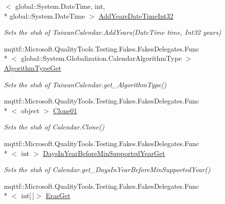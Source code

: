 \begin{DoxyCompactItemize}
$<$ global\-::\-System.\-Date\-Time, int, \\*
global\-::\-System.\-Date\-Time $>$ \hyperlink{class_system_1_1_globalization_1_1_fakes_1_1_stub_taiwan_calendar_a4f6e2936117ba147c50b7cf13d58997e}{Add\-Years\-Date\-Time\-Int32}
\begin{DoxyCompactList}\small\item\em Sets the stub of Taiwan\-Calendar.\-Add\-Years(\-Date\-Time time, Int32 years)\end{DoxyCompactList}\item 
mqttf\-::\-Microsoft.\-Quality\-Tools.\-Testing.\-Fakes.\-Fakes\-Delegates.\-Func\\*
$<$ global\-::\-System.\-Globalization.\-Calendar\-Algorithm\-Type $>$ \hyperlink{class_system_1_1_globalization_1_1_fakes_1_1_stub_taiwan_calendar_a5fa0c54b67c735e7a128d7a6c2f53996}{Algorithm\-Type\-Get}
\begin{DoxyCompactList}\small\item\em Sets the stub of Taiwan\-Calendar.\-get\-\_\-\-Algorithm\-Type()\end{DoxyCompactList}\item 
mqttf\-::\-Microsoft.\-Quality\-Tools.\-Testing.\-Fakes.\-Fakes\-Delegates.\-Func\\*
$<$ object $>$ \hyperlink{class_system_1_1_globalization_1_1_fakes_1_1_stub_taiwan_calendar_afa886acfa325244a131ee579e9dc4c14}{Clone01}
\begin{DoxyCompactList}\small\item\em Sets the stub of Calendar.\-Clone()\end{DoxyCompactList}\item 
mqttf\-::\-Microsoft.\-Quality\-Tools.\-Testing.\-Fakes.\-Fakes\-Delegates.\-Func\\*
$<$ int $>$ \hyperlink{class_system_1_1_globalization_1_1_fakes_1_1_stub_taiwan_calendar_aec82fad403368bc9fa64de1b7bda4d0f}{Days\-In\-Year\-Before\-Min\-Supported\-Year\-Get}
\begin{DoxyCompactList}\small\item\em Sets the stub of Calendar.\-get\-\_\-\-Days\-In\-Year\-Before\-Min\-Supported\-Year()\end{DoxyCompactList}\item 
mqttf\-::\-Microsoft.\-Quality\-Tools.\-Testing.\-Fakes.\-Fakes\-Delegates.\-Func\\*
$<$ int\mbox{[}$\,$\mbox{]}$>$ \hyperlink{class_system_1_1_globalization_1_1_fakes_1_1_stub_taiwan_calendar_ab8eb00a655bda02c9dbd7f110045f9cd}{Eras\-Get}

\end{DoxyCompactItemize}
